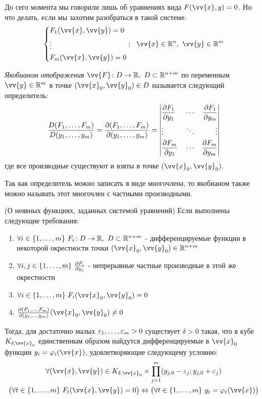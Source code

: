 \begin{note}
	До сего момента мы говорили лишь об уравнениях вида $F(\vv{x}, y) = 0$. Но что делать, если мы захотим разобраться в такой системе:
	\[
		\System{
			&{F_1(\vv{x}, \vv{y}) = 0}
			\\
			&{\vdots}
			\\
			&{F_m(\vv{x}, \vv{y}) = 0}
		};
		\ \ \vv{x} \in \R^n,\ \vv{y} \in \R^m
	\]
\end{note}

\begin{definition}
	\textit{Якобианом отображения} $\vv{F} \colon D \to \R,\ D \subset \R^{n + m}$ по переменным $\vv{y} \in \R^m$ в точке $(\vv{x}_0, \vv{y}_0) \in D$ называется следующий определитель:
	\[
		\frac{D(F_1, \ldots, F_m)}{D(y_1, \ldots, y_m)} = \frac{\partial (F_1, \ldots, F_m)}{\partial (y_1, \ldots, y_m)} = \left|\begin{aligned}
			&{\frac{\partial F_1}{\partial y_1}} & &\cdots &{\frac{\partial F_1}{\partial y_m}}
			\\
			&{\vdots} & &\ddots &\vdots
			\\
			&{\frac{\partial F_m}{\partial y_1}} & &\cdots &{\frac{\partial F_m}{\partial y_m}} 
		\end{aligned}\right|
	\]
	где все производные существуют и взяты в точке $(\vv{x}_0, \vv{y}_0)$.
\end{definition}

\begin{note}
	Так как определитель можно записать в виде многочлена, то якобианом также можно называть этот многочлен с частными производными.
\end{note}

\begin{theorem} (О неявных функциях, заданных системой уравнений)
	Если выполнены следующие требования:
	\begin{enumerate}
		\item $\forall i \in \{1, \ldots, m\}\ F_i \colon D \to \mathbb{R},\ D \subset \mathbb{R}^{n + m}$ - дифференцируемые функции в некоторой окрестности точки $(\vv{x}_0, \vv{y}_0) \in \R^{n + m}$
		
		\item $\forall i, j \in \range{m}\ \pd{F_i}{y_j}$ - непрерывные частные производные в этой же окрестности
		
		\item $\forall i \in \range{m}\ F_i(\vv{x}_0, \vv{y}_0) = 0$
		
		\item $\pd{(F_1, \ldots, F_m)}{(y_1, \ldots, y_m)}(\vv{x}_0, \vv{y}_0) \neq 0$
	\end{enumerate}
	Тогда, для достаточно малых $\varepsilon_1, \ldots, \varepsilon_m > 0$ существует $\delta > 0$ такая, что в кубе $K_{\delta, \vv{x}_0}$ единственным образом найдутся дифференцируемые в $\vv{x}_0$ функции $y_i = \phi_i(\vv{x})$, удовлетворяющие следующему условию:
	\begin{multline*}
		\forall (\vv{x}, \vv{y}) \in K_{\delta, \vv{x}_0} \times \prod_{j = 1}^m (y_{j, 0} - \eps_j; y_{j, 0} + \eps_j)
		\\
		\big(\forall t \in \range{m}\ F_t(\vv{x}, \vv{y}) = 0\big) \Lra \big(\forall t \in \range{m}\ y_t = \phi_t(\vv{x})\big)
	\end{multline*}
\end{theorem}

